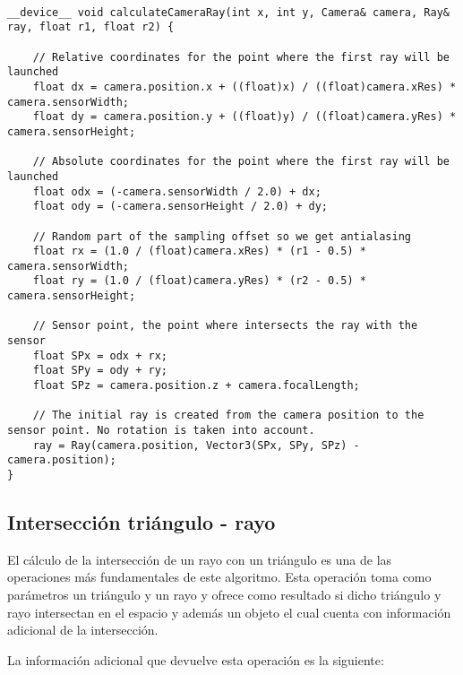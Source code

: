 \begin{lstlisting}
	
__device__ void calculateCameraRay(int x, int y, Camera& camera, Ray& ray, float r1, float r2) {

    // Relative coordinates for the point where the first ray will be launched
    float dx = camera.position.x + ((float)x) / ((float)camera.xRes) * camera.sensorWidth;
    float dy = camera.position.y + ((float)y) / ((float)camera.yRes) * camera.sensorHeight;

    // Absolute coordinates for the point where the first ray will be launched
    float odx = (-camera.sensorWidth / 2.0) + dx;
    float ody = (-camera.sensorHeight / 2.0) + dy;

    // Random part of the sampling offset so we get antialasing
    float rx = (1.0 / (float)camera.xRes) * (r1 - 0.5) * camera.sensorWidth;
    float ry = (1.0 / (float)camera.yRes) * (r2 - 0.5) * camera.sensorHeight;

    // Sensor point, the point where intersects the ray with the sensor
    float SPx = odx + rx;
    float SPy = ody + ry;
    float SPz = camera.position.z + camera.focalLength;

    // The initial ray is created from the camera position to the sensor point. No rotation is taken into account.
    ray = Ray(camera.position, Vector3(SPx, SPy, SPz) - camera.position);
}

\end{lstlisting}

	\subsection{Intersección triángulo - rayo}
	\label{subsec:triintersection}
	
El cálculo de la intersección de un rayo con un triángulo es una de las operaciones más fundamentales de este algoritmo. Esta operación toma como parámetros un triángulo  y un rayo  y ofrece como resultado si dicho triángulo y rayo intersectan en el espacio y además un objeto  el cual cuenta con información adicional de la intersección.

La información adicional que devuelve esta operación es la siguiente:

